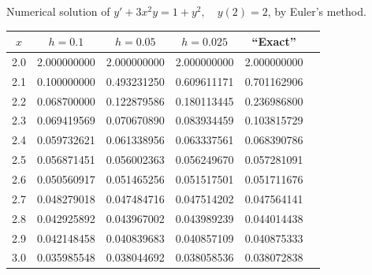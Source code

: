 \begin{examplesolution}
\begin{newtable}
  \label{table:3.1.9} Numerical solution of $y'+3x^{2}y=1+y^{2},\quad y(2)=2$, by Euler's method.
  \begin{center}
    \begin{tabular}{|c|r|r|r|r|r|}
      \hline
      \multicolumn{1}{|c|}{$x$} & \multicolumn{1}{|c|}{$h=0.1$} & \multicolumn{1}{|c|}{$h=0.05$} & \multicolumn{1}{|c|}{$h=0.025$} & \multicolumn{1}{|c|}{``Exact''} \\
      \hline
      2.0                       & 2.000000000                   & 2.000000000                    & 2.000000000                     & 2.000000000                     \\
      2.1                       & 0.100000000                   & 0.493231250                    & 0.609611171                     & 0.701162906                     \\
      2.2                       & 0.068700000                   & 0.122879586                    & 0.180113445                     & 0.236986800                     \\
      2.3                       & 0.069419569                   & 0.070670890                    & 0.083934459                     & 0.103815729                     \\
      2.4                       & 0.059732621                   & 0.061338956                    & 0.063337561                     & 0.068390786                     \\
      2.5                       & 0.056871451                   & 0.056002363                    & 0.056249670                     & 0.057281091                     \\
      2.6                       & 0.050560917                   & 0.051465256                    & 0.051517501                     & 0.051711676                     \\
      2.7                       & 0.048279018                   & 0.047484716                    & 0.047514202                     & 0.047564141                     \\
      2.8                       & 0.042925892                   & 0.043967002                    & 0.043989239                     & 0.044014438                     \\
      2.9                       & 0.042148458                   & 0.040839683                    & 0.040857109                     & 0.040875333                     \\
      3.0                       & 0.035985548                   & 0.038044692                    & 0.038058536                     & 0.038072838                     \\
      \hline
    \end{tabular}
  \end{center}
\end{newtable}


\end{examplesolution}

